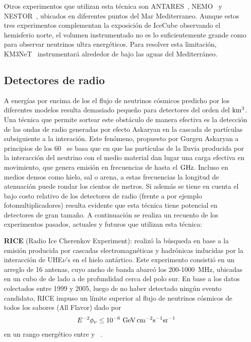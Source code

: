 	Otros experimentos que utilizan esta t\'ecnica son ANTARES~\cite{cite:Antares1}, NEMO~\cite{cite:Nemo1} y NESTOR~\cite{cite:Nestor1}, ubicados en diferentes puntos del Mar Mediterraneo.
	Aunque estos tres experimentos complementan la exposici\'on de IceCube observando el hemisferio norte, el volumen instrumentado no es lo suficientemente grande como para observar neutrinos ultra energ\'eticos.
	Para resolver esta limitaci\'on, KM3NeT~\cite{cite:km3Net1} instrumentar\'a alrededor de  bajo las aguas del Mediterr\'aneo.
	
	\subsection{Detectores de radio}
	A energ\'ias por encima de los  el flujo de neutrinos c\'osmicos predicho por los diferentes modelos resulta demasiado peque\~no para  detectores del orden del $\rm km^3$. 
	Una t\'ecnica que permite sortear este obst\'aculo de manera efectiva es la detecci\'on de las ondas de radio generadas por efecto Askaryan en la cascada de part\'iculas subsiguiente a la interaci\'on. Este fenómeno, propuesto por Gurgen Askaryan a principios de los 60~\cite{cite:Askaryan} se basa que en que las part\'iculas de la lluvia producida por la interacci\'on del neutrino con el medio material dan lugar una carga efectiva en movimiento, que genera emisi\'on \cher{} en frecuencias de hasta el $\rm GHz$.
	Incluso en medios densos como hielo, sal o arena, a estas frecuencias la longitud de atenuaci\'on puede rondar los cientos de metros.
	Si adem\'as se tiene en cuenta el bajo costo relativo de los detectores de radio (frente a por ejemplo fotomultiplicadores) resulta evidente que esta t\'ecnica tiene potencial en detectores de gran tama\~no.
	A continuaci\'on se realiza un recuento de los experimentos pasados, actuales y futuros que utilizan esta t\'ecnica:
	
	\textbf{RICE} (Radio Ice Cherenkov Experiment): realiz\'o la b\'usqueda en base a la emisi\'on producida por cascadas electromagn\'eticas y hadr\'onicas inducidas por la interacci\'on de UHE$\nu$'s en el hielo ant\'artico.
	Este experimento consisti\'o en un arreglo de 16 antenas, cuyo ancho de banda abarc\'o los 200-1000~MHz, ubicadas en un cubo de  de lado a  de profundidad cerca del polo sur.
	En base a los datos colectados entre 1999 y 2005, luego de no haber detectado ning\'un evento candidato,
RICE impuso un l\'imite superior al flujo de neutrinos c\'osmicos de todos los sabores (All Flavor) dado por
	\begin{equation}
	 E^{-2}\phi_\nu \leq 10^{-6}{\rm\ GeV\,cm^{-2}s^{-1}sr^{-1}}
	\end{equation}
	en un rango energ\'etico entre  y ~\cite{cite:RICE}.
	 
